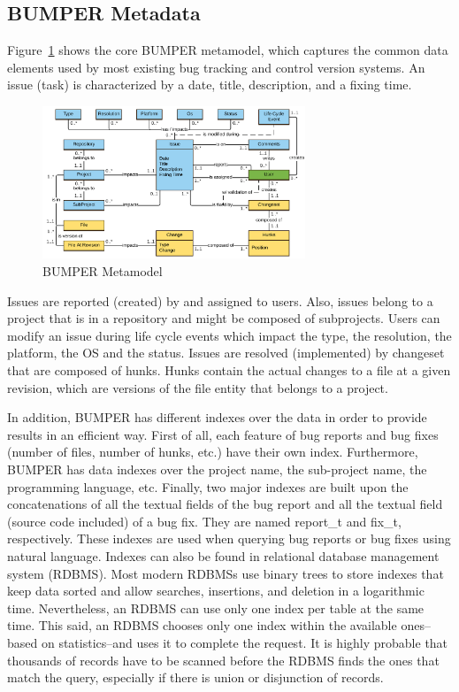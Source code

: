 \documentclass[conference]{IEEEtran}
\begin{document}
\subsection{BUMPER Metadata}
\label{sub:BUMPER Metadata}

Figure~\ref{fig:bumper-metamodel}  shows the core BUMPER metamodel, which captures the common data elements used by most existing bug tracking and control version systems. An issue (task) is characterized by a date, title, description, and a fixing time.

\begin{figure}
  \centering
  \includegraphics[width=0.7\textwidth]{media/Bumper-Model.png}
  \caption{BUMPER Metamodel\label{fig:bumper-metamodel}}
\vspace{-1.8em}
\end{figure}

Issues are reported (created) by and assigned to users.
Also, issues belong to a project that is in a repository and might be composed of subprojects.
Users can modify an issue during life cycle events which impact the type, the resolution, the platform, the OS and the status. Issues are resolved (implemented) by changeset that are composed of hunks.
Hunks contain the actual changes to a file at a given revision, which are versions of the file entity that belongs to a project.

In addition, BUMPER has different indexes over the data in order to provide results in an efficient way.
First of all, each feature of bug reports and bug fixes (number of files, number of hunks, etc.) have their own index.
Furthermore, BUMPER has data indexes over the project name, the sub-project name, the programming language, etc.
Finally, two major indexes are built upon the concatenations of all the textual fields of the bug report and all the textual field (source code included) of a bug fix.
They are named report\_t and fix\_t, respectively.
These indexes are used when querying bug reports or bug fixes using natural language.
Indexes can also be found in relational database management system (RDBMS).
Most modern RDBMSs use binary trees to store indexes that keep data sorted and allow searches, insertions, and deletion in a logarithmic time.
Nevertheless, an RDBMS can use only one index per table at the same time.
This said, an RDBMS chooses only one index within the available ones--based on statistics--and uses it to complete the request.
It is highly probable that thousands of records have to be scanned before the RDBMS finds the ones that match the query, especially if there is union or disjunction of records.
\end{document}
